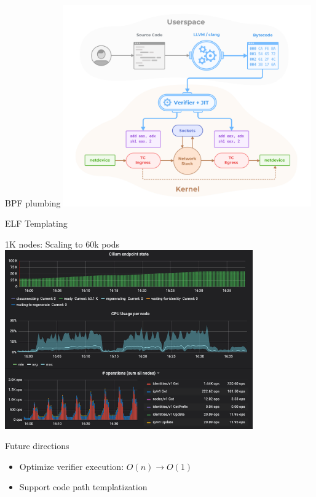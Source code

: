 \documentclass[black,white]{beamer}
\DeclareRobustCommand{\#}{\adjustbox{valign=B,totalheight=.57\baselineskip}{\oldhash}}%
\begin{document}
    \begin{frame}{BPF plumbing}
        \centering
        \includegraphics[width=0.8\textwidth,keepaspectratio]{bpf-verifier.png}
    \end{frame}


    \begin{frame}{ELF Templating}
        \centering
        
    \end{frame}

    \begin{frame}{1K nodes: Scaling to 60k pods}
        \centering
        \includegraphics[width=0.8\textwidth]{scaling_to_60k_pods.png}
    \end{frame}

    \begin{frame}{Future directions}
        \centering
        \begin{itemize}
            \item Optimize verifier execution: $O(n) \rightarrow O(1)$ \medskip
            \item Support code path templatization \medskip
        \end{itemize}
    \end{frame}
\end{document}
